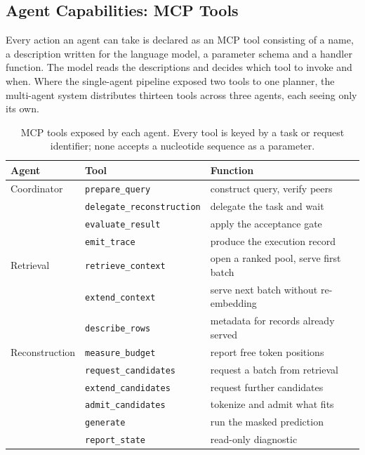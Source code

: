 \subsection{Agent Capabilities: MCP Tools}

Every action an agent can take is declared as an MCP tool consisting of a name, a
description written for the language model, a parameter schema and a handler function. The
model reads the descriptions and decides which tool to invoke and when. Where the
single-agent pipeline exposed two tools to one planner, the multi-agent system distributes
thirteen tools across three agents, each seeing only its own.

\begin{table}[H]
\centering
\begin{tabular}{lll}
\toprule
\textbf{Agent} & \textbf{Tool} & \textbf{Function} \\
\midrule
Coordinator    & \texttt{prepare\_query}           & construct query, verify peers \\
               & \texttt{delegate\_reconstruction} & delegate the task and wait \\
               & \texttt{evaluate\_result}         & apply the acceptance gate \\
               & \texttt{emit\_trace}              & produce the execution record \\
\midrule
Retrieval      & \texttt{retrieve\_context}        & open a ranked pool, serve first batch \\
               & \texttt{extend\_context}          & serve next batch without re-embedding \\
               & \texttt{describe\_rows}           & metadata for records already served \\
\midrule
Reconstruction & \texttt{measure\_budget}          & report free token positions \\
               & \texttt{request\_candidates}      & request a batch from retrieval \\
               & \texttt{extend\_candidates}       & request further candidates \\
               & \texttt{admit\_candidates}        & tokenize and admit what fits \\
               & \texttt{generate}                 & run the masked prediction \\
               & \texttt{report\_state}            & read-only diagnostic \\
\bottomrule
\end{tabular}
\caption{MCP tools exposed by each agent. Every tool is keyed by a task or request
identifier; none accepts a nucleotide sequence as a parameter.}
\label{tab:mcp-tools}
\end{table}

